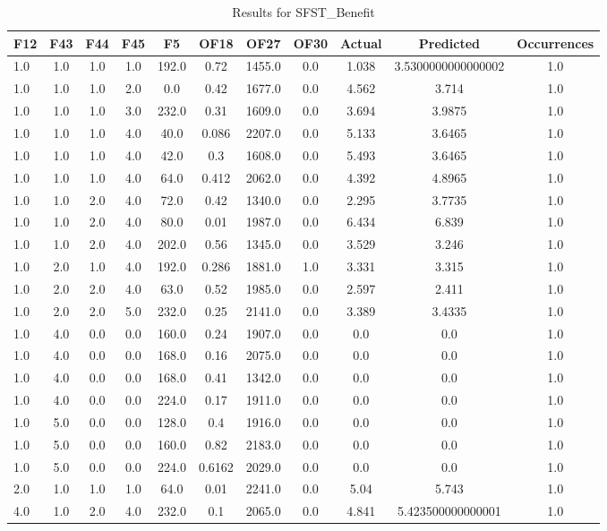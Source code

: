 \clearpage
\begin{table}[htbp]
\centering
\begin{tabular}{|l|c|c|c|c|c|c|c|c|c|c|}
\hline
F12 & F43 & F44 & F45 & F5 & OF18 & OF27 & OF30 & Actual & Predicted & Occurrences \\
\hline
1.0 & 1.0 & 1.0 & 1.0 & 192.0 & 0.72 & 1455.0 & 0.0 & 1.038 & 3.5300000000000002 & 1.0 \\
1.0 & 1.0 & 1.0 & 2.0 & 0.0 & 0.42 & 1677.0 & 0.0 & 4.562 & 3.714 & 1.0 \\
1.0 & 1.0 & 1.0 & 3.0 & 232.0 & 0.31 & 1609.0 & 0.0 & 3.694 & 3.9875 & 1.0 \\
1.0 & 1.0 & 1.0 & 4.0 & 40.0 & 0.086 & 2207.0 & 0.0 & 5.133 & 3.6465 & 1.0 \\
1.0 & 1.0 & 1.0 & 4.0 & 42.0 & 0.3 & 1608.0 & 0.0 & 5.493 & 3.6465 & 1.0 \\
1.0 & 1.0 & 1.0 & 4.0 & 64.0 & 0.412 & 2062.0 & 0.0 & 4.392 & 4.8965 & 1.0 \\
1.0 & 1.0 & 2.0 & 4.0 & 72.0 & 0.42 & 1340.0 & 0.0 & 2.295 & 3.7735 & 1.0 \\
1.0 & 1.0 & 2.0 & 4.0 & 80.0 & 0.01 & 1987.0 & 0.0 & 6.434 & 6.839 & 1.0 \\
1.0 & 1.0 & 2.0 & 4.0 & 202.0 & 0.56 & 1345.0 & 0.0 & 3.529 & 3.246 & 1.0 \\
1.0 & 2.0 & 1.0 & 4.0 & 192.0 & 0.286 & 1881.0 & 1.0 & 3.331 & 3.315 & 1.0 \\
1.0 & 2.0 & 2.0 & 4.0 & 63.0 & 0.52 & 1985.0 & 0.0 & 2.597 & 2.411 & 1.0 \\
1.0 & 2.0 & 2.0 & 5.0 & 232.0 & 0.25 & 2141.0 & 0.0 & 3.389 & 3.4335 & 1.0 \\
1.0 & 4.0 & 0.0 & 0.0 & 160.0 & 0.24 & 1907.0 & 0.0 & 0.0 & 0.0 & 1.0 \\
1.0 & 4.0 & 0.0 & 0.0 & 168.0 & 0.16 & 2075.0 & 0.0 & 0.0 & 0.0 & 1.0 \\
1.0 & 4.0 & 0.0 & 0.0 & 168.0 & 0.41 & 1342.0 & 0.0 & 0.0 & 0.0 & 1.0 \\
1.0 & 4.0 & 0.0 & 0.0 & 224.0 & 0.17 & 1911.0 & 0.0 & 0.0 & 0.0 & 1.0 \\
1.0 & 5.0 & 0.0 & 0.0 & 128.0 & 0.4 & 1916.0 & 0.0 & 0.0 & 0.0 & 1.0 \\
1.0 & 5.0 & 0.0 & 0.0 & 160.0 & 0.82 & 2183.0 & 0.0 & 0.0 & 0.0 & 1.0 \\
1.0 & 5.0 & 0.0 & 0.0 & 224.0 & 0.6162 & 2029.0 & 0.0 & 0.0 & 0.0 & 1.0 \\
2.0 & 1.0 & 1.0 & 1.0 & 64.0 & 0.01 & 2241.0 & 0.0 & 5.04 & 5.743 & 1.0 \\
4.0 & 1.0 & 2.0 & 4.0 & 232.0 & 0.1 & 2065.0 & 0.0 & 4.841 & 5.423500000000001 & 1.0 \\
\hline
\end{tabular}
\caption{Results for SFST_Benefit}
\label{tab:SFST_Benefit_results}
\end{table}
\clearpage
